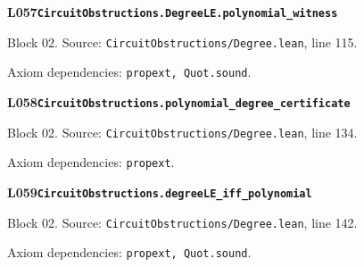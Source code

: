 \begin{minipage}{\linewidth}
\hypertarget{L057}{}
{\small\sffamily\bfseries\color{ink}L057\quad\nolinkurl{CircuitObstructions.DegreeLE.polynomial_witness}}\par
{\scriptsize\sffamily\color{muted}Block 02. Source: \nolinkurl{CircuitObstructions/Degree.lean}, line 115.}\par
{}
{\scriptsize\sffamily\color{muted}Axiom dependencies: \nolinkurl{propext, Quot.sound}.}
\end{minipage}\par\medskip
\begin{minipage}{\linewidth}
\hypertarget{L058}{}
{\small\sffamily\bfseries\color{ink}L058\quad\nolinkurl{CircuitObstructions.polynomial_degree_certificate}}\par
{\scriptsize\sffamily\color{muted}Block 02. Source: \nolinkurl{CircuitObstructions/Degree.lean}, line 134.}\par
{}
{\scriptsize\sffamily\color{muted}Axiom dependencies: \nolinkurl{propext}.}
\end{minipage}\par\medskip
\begin{minipage}{\linewidth}
\hypertarget{L059}{}
{\small\sffamily\bfseries\color{ink}L059\quad\nolinkurl{CircuitObstructions.degreeLE_iff_polynomial}}\par
{\scriptsize\sffamily\color{muted}Block 02. Source: \nolinkurl{CircuitObstructions/Degree.lean}, line 142.}\par
{}
{\scriptsize\sffamily\color{muted}Axiom dependencies: \nolinkurl{propext, Quot.sound}.}
\end{minipage}\par\medskip

